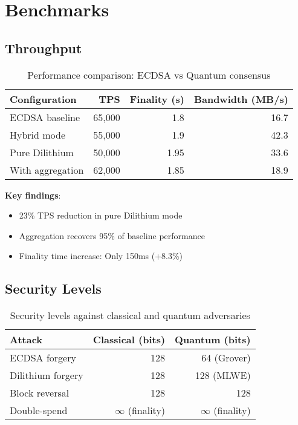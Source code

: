 \documentclass[11pt,letterpaper]{article}
\begin{document}
\section{Benchmarks}

\subsection{Throughput}

\begin{table}[h]
\centering
\begin{tabular}{lrrr}
\toprule
\textbf{Configuration} & \textbf{TPS} & \textbf{Finality (s)} & \textbf{Bandwidth (MB/s)} \\
\midrule
ECDSA baseline & 65,000 & 1.8 & 16.7 \\
Hybrid mode & 55,000 & 1.9 & 42.3 \\
Pure Dilithium & 50,000 & 1.95 & 33.6 \\
With aggregation & 62,000 & 1.85 & 18.9 \\
\bottomrule
\end{tabular}
\caption{Performance comparison: ECDSA vs Quantum consensus}
\end{table}

\textbf{Key findings}:
\begin{itemize}
    \item 23\% TPS reduction in pure Dilithium mode
    \item Aggregation recovers 95\% of baseline performance
    \item Finality time increase: Only 150ms (+8.3\%)
\end{itemize}

\subsection{Security Levels}

\begin{table}[h]
\centering
\begin{tabular}{lrr}
\toprule
\textbf{Attack} & \textbf{Classical (bits)} & \textbf{Quantum (bits)} \\
\midrule
ECDSA forgery & 128 & 64 (Grover) \\
Dilithium forgery & 128 & 128 (MLWE) \\
Block reversal & 128 & 128 \\
Double-spend & $\infty$ (finality) & $\infty$ (finality) \\
\bottomrule
\end{tabular}
\caption{Security levels against classical and quantum adversaries}
\end{table}
\end{document}
